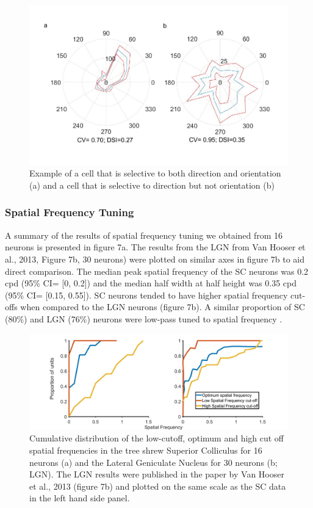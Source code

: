 	\begin{figure}[H]
		\includegraphics[width=\linewidth]{superiorcolliculus/Directionselectivity.jpg}
		\caption{Example of a cell that is selective to both direction
			and orientation (a) and a cell that is selective to direction but not
			orientation (b)}
		\label{fig:dseg}			
	\end{figure}
	
	\subsubsection{Spatial Frequency Tuning}
	
A summary of the results of spatial frequency tuning we obtained from 16
neurons is presented in figure 7a. The results from the LGN from Van
Hooser et al., 2013, Figure 7b, 30 neurons) were plotted on similar axes
in figure 7b to aid direct comparison. The median peak spatial frequency
of the SC neurons was 0.2 cpd (95\% CI= [0, 0.2]) and the median
half width at half height was 0.35 cpd (95\% CI= [0.15, 0.55]). SC
neurons tended to have higher spatial frequency cut-offs when compared
to the LGN neurons (figure 7b). A similar proportion of SC (80\%) and
LGN (76\%) neurons were low-pass tuned to spatial frequency .
	
	\begin{figure}[]
		\includegraphics[width=\linewidth]{superiorcolliculus/cumsum_sf_SC_LGN.jpg}
		\caption{Cumulative distribution of the low-cutoff,
			optimum and high cut off spatial frequencies in the tree shrew Superior
			Colliculus for 16 neurons (a) and the Lateral Geniculate Nucleus for 30
			neurons (b; LGN). The LGN results were published in the paper by Van
			Hooser et al., 2013 (figure 7b) and plotted on the same scale as the SC
			data in the left hand side panel.}
		\label{fig:sfcumdist}			
	\end{figure}
	
